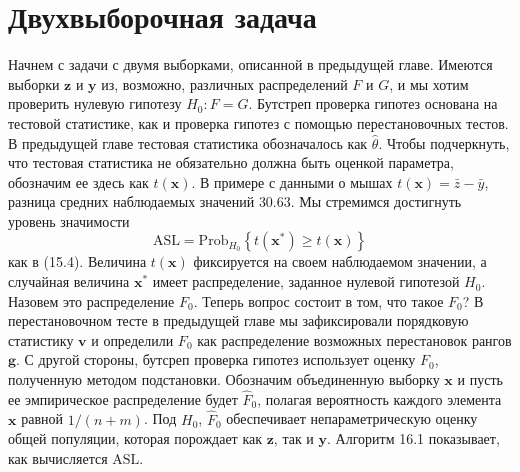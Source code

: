 \section{Двухвыборочная задача}

Начнем с задачи с двумя выборками, описанной в предыдущей главе. Имеются выборки $\mathbf{z}$ и $\mathbf{y}$ из, возможно, различных распределений $F$ и $G$, и мы хотим проверить нулевую гипотезу $H_0: F = G$. Бутстреп проверка гипотез основана на тестовой статистике, как и проверка гипотез с помощью перестановочных тестов. В предыдущей главе тестовая статистика обозначалось как $\hat{\theta}$. Чтобы подчеркнуть, что тестовая статистика не обязательно должна быть оценкой параметра, обозначим ее здесь как $t(\mathbf{x})$. В примере с данными о мышах $t(\mathbf{x}) = \bar{z}-\bar{y}$, разница средних наблюдаемых значений $30.63$. Мы стремимся достигнуть уровень значимости
\begin{equation}\label{eq16.1}
    \text{ASL} = \mathrm{Prob}_{H_0}\left\{t(\mathbf{x}^{*}) \geq t(\mathbf{x})\right\}
\end{equation}
как в (15.4). Величина $t(\mathbf{x})$ фиксируется на своем наблюдаемом значении, а случайная величина $\mathbf{x}^{*}$ имеет распределение, заданное нулевой гипотезой $H_0$. Назовем это распределение $F_0$. Теперь вопрос состоит в том, что такое  $F_0$? В перестановочном тесте в предыдущей главе мы зафиксировали порядковую статистику $\mathbf{v}$ и определили $F_0$ как распределение возможных перестановок рангов $\mathbf{g}$. С другой стороны, бутсреп проверка гипотез использует оценку $F_0$, полученную методом подстановки. Обозначим объединенную выборку $\mathbf{x}$ и пусть ее эмпирическое распределение будет $\hat{F}_0$, полагая вероятность каждого элемента $\mathbf{x}$ равной $1/(n + m)$. Под $H_0$, $\hat{F}_0$ обеспечивает непараметрическую оценку общей популяции, которая порождает как $\mathbf{z}$, так и $\mathbf{y}$. Алгоритм 16.1 показывает, как вычисляется $\text{ASL}$.

